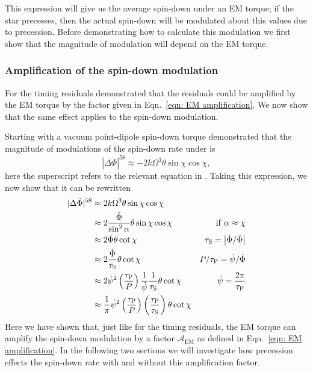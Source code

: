 \documentclass[../full_thesis/full_thesis.tex]{subfiles}
\begin{document}
This expression will give us the average spin-down under an EM torque; if the
star precesses, then the actual spin-down will be modulated about this values
due to precession. Before demonstrating how to calculate this modulation we
first show that the magnitude of modulation will depend on the EM torque.

\subsubsection{Amplification of the spin-down modulation}

For the timing residuals \citet{Jones2001} demonstrated that the residuals
could be amplified by the EM torque by the factor given in Eqn.~\ref{eqn: EM
amplification}. We now show that the same effect applies
to the spin-down modulation.


Starting with a vacuum point-dipole spin-down torque \citet{Jones2001}
demonstrated that the magnitude of modulations of the spin-down rate under is
\begin{equation}
    |\Delta\ddot{\Phi}|^{58} \approx -2k\Omega^{3} \theta \sin\chi \cos\chi,
\end{equation}
here the superscript refers to the relevant equation in \citet{Jones2001}. Taking
this expression, we now show that it can be rewritten
\begin{align}
    |\Delta\ddot{\Phi}|^{58}
    & \approx 2k\Omega^{3} \theta \sin\chi \cos\chi & \\
    & \approx 2 \frac{\ddot{\Phi}}{\sin^{2}\alpha} \theta \sin\chi\cos\chi &
    \mathrm{if }\; \alpha \approx \chi \\
    & \approx 2 \ddot{\Phi}\theta \cot\chi &
    \tau_{\mathrm{S}} = \left| \dot{\Phi} / \ddot{\Phi}\right| \\
    & \approx 2 \frac{\dot{\Phi}}{\tau_{\mathrm{S}}} \theta \cot\chi &
    P/\tau_{\mathrm{P}} = \dot{\psi}/\dot{\Phi} \\
    & \approx 2 \dot{\psi}^{2}\left(\frac{\tau_{\mathrm{P}}}{P}\right) \frac{1}{\dot{\psi}} \frac{1}{\tau_{\mathrm{S}}} \theta \cot \chi & \dot{\psi} = \frac{2\pi}{\tau_{\mathrm{P}}} \\
    & \approx \frac{1}{\pi}\dot{\psi}^{2}\left(\frac{\tau_{\mathrm{P}}}{P}\right)\left(\frac{\tau_{\mathrm{P}}}{\tau_{\mathrm{S}}}\right) \theta \cot\chi
    \label{eqn: spin-down variations FP EM}
\end{align}
Here we have shown that, just like for the timing residuals, the EM torque can
amplify the spin-down modulation by a factor $\mathcal{A}_{\mathrm{EM}}$ as
defined in Eqn.~\eqref{eqn: EM amplification}. In the following two sections
we will investigate how precession effects the spin-down rate with and without
this amplification factor.
\end{document}
